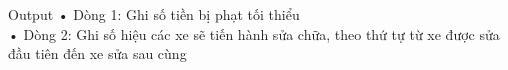 Output
• Dòng 1: Ghi số tiền bị phạt tối thiểu
\\• Dòng 2: Ghi số hiệu các xe sẽ tiến hành sửa chữa, theo thứ tự từ xe được sửa đầu tiên đến xe sửa sau cùng